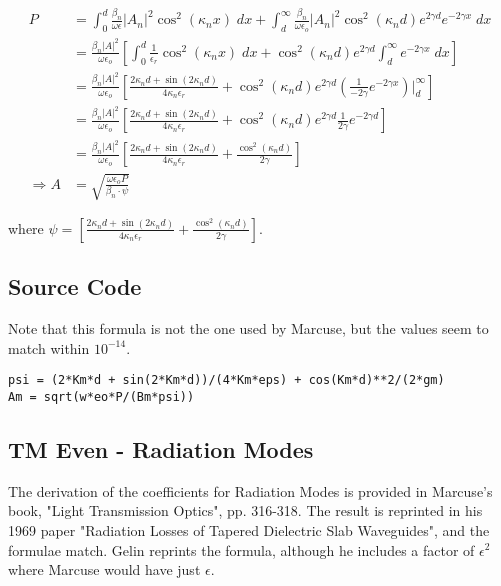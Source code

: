 \documentclass[11pt, oneside]{article}   	%
\begin{document}
\begin{align*}
P &= \int_{0}^{d} \frac{\beta_{n}}{\omega \epsilon} |A_{n}|^{2} \cos^{2}(\kappa_{n} x) \; dx + \int_{d}^{\infty} \frac{\beta_{n}}{\omega \epsilon_{o}} |A_{n}|^{2} \cos^{2}(\kappa_{n}d) e^{2 \gamma d} e^{-2 \gamma x} \; dx \\
&= \frac{\beta_{n} |A|^{2}}{\omega \epsilon_{o}} \left[ \int_{0}^{d}  \frac{1}{\epsilon_{r}} \cos^{2}(\kappa_{n} x) \; dx + \cos^{2}(\kappa_{n}d) e^{2 \gamma d} \int_{d}^{\infty} e^{-2 \gamma x} \; dx \right] \\
&= \frac{\beta_{n} |A|^{2}}{\omega \epsilon_{o}} \left[  \frac{2\kappa_{n} d + \sin(2\kappa_{n} d)}{4\kappa_{n} \epsilon_{r}} + \cos^{2}(\kappa_{n}d) e^{2 \gamma d} \left( \frac{1}{-2 \gamma} e^{-2 \gamma x}\right) \bigg|_{d}^{\infty} \right] \\
&= \frac{\beta_{n} |A|^{2}}{\omega \epsilon_{o}} \left[  \frac{2\kappa_{n} d + \sin(2\kappa_{n} d)}{4\kappa_{n} \epsilon_{r}} + \cos^{2}(\kappa_{n}d) e^{2 \gamma d} \frac{1}{2 \gamma} e^{-2 \gamma d} \right] \\
&= \frac{\beta_{n} |A|^{2}}{\omega \epsilon_{o}} \left[  \frac{2\kappa_{n} d + \sin(2\kappa_{n} d)}{4\kappa_{n} \epsilon_{r}} + \frac{\cos^{2}(\kappa_{n}d)}{2 \gamma} \right] \\
\Rightarrow A &= \sqrt{\frac{\omega \epsilon_{o} P}{\beta_{n} \cdot \psi}}
\end{align*}

where $\psi = \left[  \frac{2\kappa_{n} d + \sin(2\kappa_{n} d)}{4\kappa_{n} \epsilon_{r}} + \frac{\cos^{2}(\kappa_{n}d)}{2 \gamma} \right]$.

\subsection{Source Code}

\noindent Note that this formula is not the one used by Marcuse, but the values seem to match within $10^{-14}$.

\begin{lstlisting}
psi = (2*Km*d + sin(2*Km*d))/(4*Km*eps) + cos(Km*d)**2/(2*gm)
Am = sqrt(w*eo*P/(Bm*psi))
\end{lstlisting}

\subsection{TM Even - Radiation Modes}

The derivation of the coefficients for Radiation Modes is provided in Marcuse's book, "Light Transmission Optics", pp. 316-318. The result is reprinted in his 1969 paper "Radiation Losses of Tapered Dielectric Slab Waveguides", and the formulae match. Gelin reprints the formula, although he includes a factor of $\epsilon^{2}$ where Marcuse would have just $\epsilon$.
\end{document}
